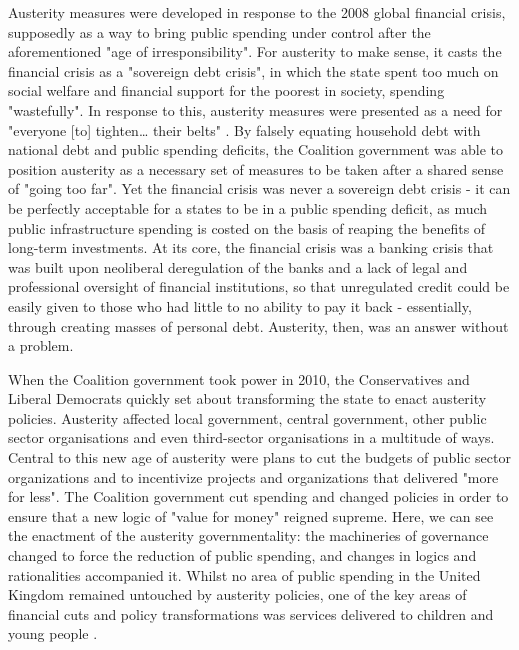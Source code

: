 Austerity measures were developed in response to the 2008 global financial crisis, supposedly as a way to bring public spending under control after the aforementioned "age of irresponsibility". For austerity to make sense, it casts the financial crisis as a "sovereign debt crisis", in which the state spent too much on social welfare and financial support for the poorest in society, spending "wastefully". In response to this, austerity measures were presented as a need for "everyone [to] tighten\ldots{} their belts" \citep[13]{blyth_austerity_2013}. By falsely equating household debt with national debt and public spending deficits, the Coalition government was able to position austerity as a necessary set of measures to be taken after a shared sense of "going too far". Yet the financial crisis was never a sovereign debt crisis - it can be perfectly acceptable for a states to be in a public spending deficit, as much public infrastructure spending is costed on the basis of reaping the benefits of long-term investments. At its core, the financial crisis was a banking crisis that was built upon neoliberal deregulation of the banks and a lack of legal and professional oversight of financial institutions, so that unregulated credit could be easily given to those who had little to no ability to pay it back - essentially, through creating masses of personal debt. Austerity, then, was an answer without a problem.

When the Coalition government took power in 2010, the Conservatives and Liberal Democrats quickly set about transforming the state to enact austerity policies. Austerity affected local government, central government, other public sector organisations and even third-sector organisations in a multitude of ways. Central to this new age of austerity were plans to cut the budgets of public sector organizations and to incentivize projects and organizations that delivered "more for less". The Coalition government cut spending and changed policies in order to ensure that a new logic of "value for money" reigned supreme.  Here, we can see the enactment of the austerity governmentality: the machineries of governance changed to force the reduction of public spending, and changes in logics and rationalities accompanied it. Whilst no area of public spending in the United Kingdom remained untouched by austerity policies, one of the key areas of financial cuts and policy transformations was services delivered to children and young people \citep{youdell_assembling_2015}.

